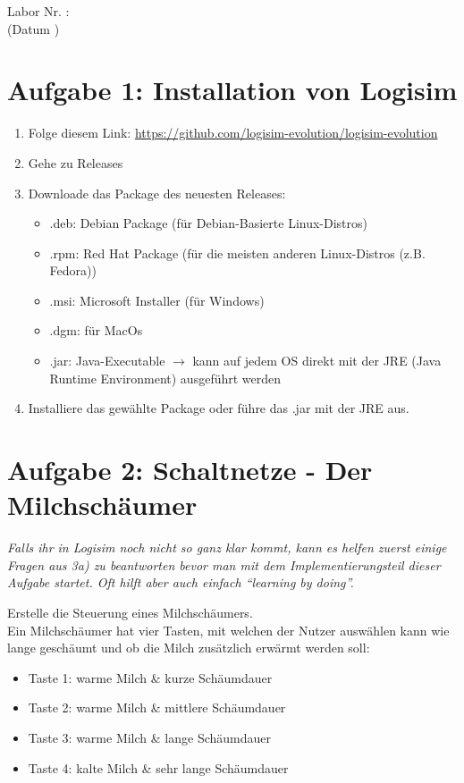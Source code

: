 \documentclass[a4paper]{scrartcl}
\def\header#1#2{
  \begin{center}
    {\Large Labor #1: \TOPIC}\\
    {(Datum #2)}
  \end{center}
}
\begin{document}
\header{Nr. \NUMBER}{\DATE}



\section*{Aufgabe 1: Installation von Logisim}
\begin{enumerate}
	\item Folge diesem Link: \href{https://github.com/logisim-evolution/logisim-evolution}{https://github.com/logisim-evolution/logisim-evolution}
	\item Gehe zu Releases
	\item Downloade das Package des neuesten Releases:
	\begin{itemize}
		\item .deb: Debian Package (für Debian-Basierte Linux-Distros)
		\item .rpm: Red Hat Package (für die meisten anderen Linux-Distros (z.B. Fedora))
		\item .msi: Microsoft Installer (für Windows)
		\item .dgm: für MacOs
		\item .jar: Java-Executable $\rightarrow$ kann auf jedem OS direkt mit der JRE (Java Runtime Environment) ausgeführt werden
	\end{itemize}
	\item Installiere das gewählte Package oder führe das .jar mit der JRE aus.
\end{enumerate}

\section*{Aufgabe 2: Schaltnetze - Der Milchschäumer}
\textit{Falls ihr in Logisim noch nicht so ganz klar kommt, 
kann es helfen zuerst einige Fragen aus 3a) zu beantworten bevor man mit dem Implementierungsteil
dieser Aufgabe startet. Oft hilft aber auch einfach ``learning by doing''.\\}

Erstelle die Steuerung eines Milchschäumers. \\
Ein Milchschäumer hat vier Tasten, mit welchen der Nutzer auswählen kann wie lange geschäumt und ob die Milch zusätzlich erwärmt werden soll:
\begin{itemize}
	\item Taste 1: warme Milch \& kurze Schäumdauer
	\item Taste 2: warme Milch \& mittlere Schäumdauer
	\item Taste 3: warme Milch \& lange Schäumdauer
	\item Taste 4: kalte Milch \& sehr lange Schäumdauer
\end{itemize}
\end{document}
